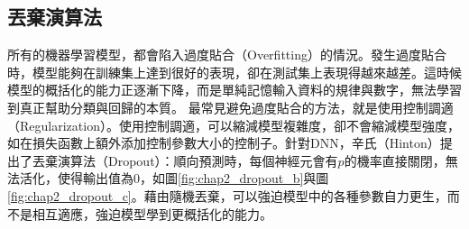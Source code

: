 \subsection{丟棄演算法}
所有的機器學習模型，都會陷入過度貼合（Overfitting）的情況。發生過度貼合時，模型能夠在訓練集上達到很好的表現，卻在測試集上表現得越來越差。這時候模型的概括化的能力正逐漸下降，而是單純記憶輸入資料的規律與數字，無法學習到真正幫助分類與回歸的本質。
最常見避免過度貼合的方法，就是使用控制調適（Regularization）。使用控制調適，可以縮減模型複雜度，卻不會縮減模型強度，如在損失函數上額外添加控制參數大小的控制子。針對DNN，辛氏（Hinton）提出了丟棄演算法（Dropout）\cite{srivastava2014dropout}：順向預測時，每個神經元會有$p$的機率直接關閉，無法活化，使得輸出值為$0$，如圖\ref{fig:chap2_dropout_b}與圖\ref{fig:chap2_dropout_c}。藉由隨機丟棄，可以強迫模型中的各種參數自力更生，而不是相互適應，強迫模型學到更概括化的能力。


